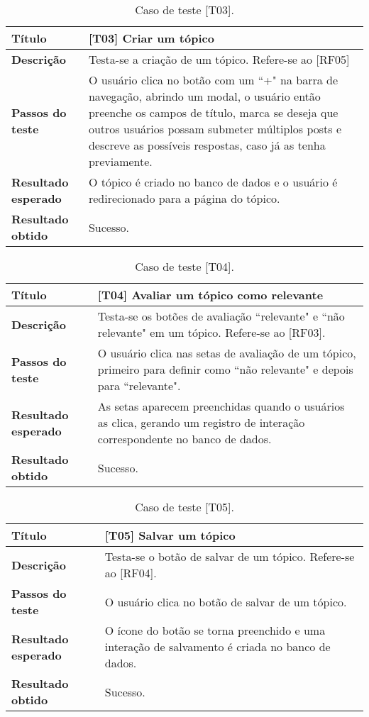 \begin{table}[hbt!]
    \centering
    \begin{tabularx}{0.9\textwidth}{l|X}
    \hline
    \textbf {Título} & [T03] Criar um tópico\\\hline
    \textbf {Descrição} & Testa-se a criação de um tópico. Refere-se ao [RF05] \\ \hline
    \textbf {Passos do teste} & O usuário clica no botão com um “+" na barra de navegação, abrindo um modal, o usuário então preenche os campos de título, marca se deseja que outros usuários possam submeter múltiplos posts e descreve as possíveis respostas, caso já as tenha previamente. \\ \hline
    \textbf {Resultado esperado}& O tópico é criado no banco de dados e o usuário é redirecionado para a página do tópico. \\ \hline
    \textbf {Resultado obtido} & Sucesso. \\ \hline
    \end{tabularx}
    \caption{Caso de teste [T03].}
\end{table}


\begin{table}[hbt!]
    \centering
    \begin{tabularx}{0.9\textwidth}{l|X}
    \hline
    \textbf {Título} & [T04] Avaliar um tópico como relevante \\\hline
    \textbf {Descrição} & Testa-se os botões de avaliação “relevante" e “não relevante" em um tópico. Refere-se ao [RF03]. \\ \hline
    \textbf {Passos do teste} & O usuário clica nas setas de avaliação de um tópico, primeiro para definir como “não relevante" e depois para “relevante". \\ \hline
    \textbf {Resultado esperado}& As setas aparecem preenchidas quando o usuários as clica, gerando um registro de interação correspondente no banco de dados. \\ \hline
    \textbf {Resultado obtido} & Sucesso. \\ \hline
    \end{tabularx}
    \caption{Caso de teste [T04].}
\end{table}

\begin{table}[hbt!]
    \centering
    \begin{tabularx}{0.9\textwidth}{l|X}
    \hline
    \textbf {Título} & [T05] Salvar um tópico \\\hline
    \textbf {Descrição} & Testa-se o botão de salvar de um tópico. Refere-se ao [RF04]. \\ \hline
    \textbf {Passos do teste} & O usuário clica no botão de salvar de um tópico. \\ \hline
    \textbf {Resultado esperado}& O ícone do botão se torna preenchido e uma interação de salvamento é criada no banco de dados. \\ \hline
    \textbf {Resultado obtido} & Sucesso. \\ \hline
    \end{tabularx}
    \caption{Caso de teste [T05].}
\end{table}

